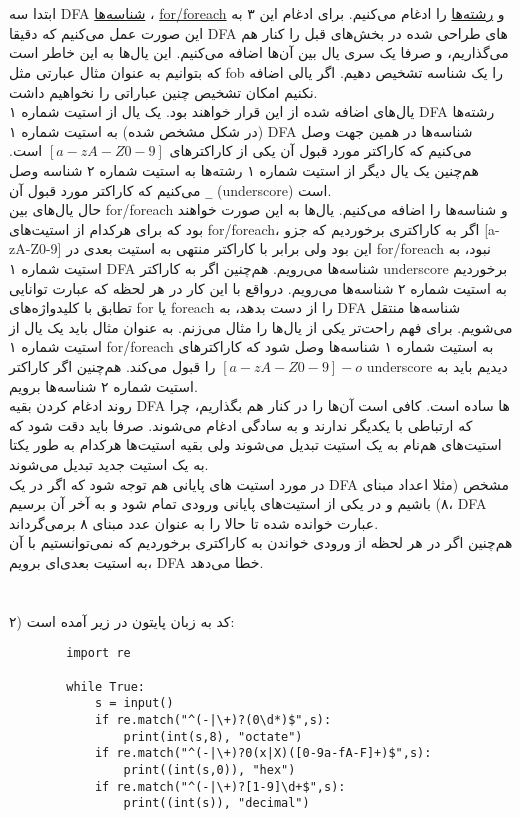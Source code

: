 \\\\
ابتدا سه DFA 
\underline{شناسه‌ها‌}
،
\underline{for/foreach}
و 
\underline{رشته‌ها}
 را ادغام می‌کنیم. برای ادغام این ۳ به این صورت عمل می‌کنیم که دقیقا DFA های طراحی شده در بخش‌های قبل را کنار هم می‌گذاریم، و صرفا یک سری یال بین آن‌ها اضافه می‌کنیم. این یال‌ها به این خاطر است که بتوانیم به عنوان مثال عبارتی مثل fob را یک شناسه تشخیص دهیم. اگر یالی اضافه نکنیم امکان تشخیص چنین عباراتی را نخواهیم داشت.
\\
یال‌های اضافه شده از این قرار خواهند بود. یک یال از استیت شماره ۱ DFA رشته‌ها (در شکل مشخص شده) به استیت شماره ۱ DFA شناسه‌ها در همین جهت وصل می‌کنیم که کاراکتر مورد قبول آن یکی از کاراکترهای $[a-zA-Z0-9]$ است. هم‌چنین یک یال دیگر از استیت شماره ۱ رشته‌ها به استیت شماره ۲ شناسه وصل می‌کنیم که کاراکتر مورد قبول آن 
\verb/_/
(underscore) است.
\\
 حال یال‌های بین for/foreach و شناسه‌ها را اضافه می‌کنیم. یال‌ها به این صورت خواهند بود که برای هرکدام از استیت‌های for/foreach، اگر به کاراکتری برخوردیم که جزو [a-zA-Z0-9] این بود ولی برابر با کاراکتر منتهی به استیت بعدی در for/foreach نبود، به استیت شماره ۱ DFA شناسه‌ها می‌رویم. هم‌چنین اگر به کاراکتر underscore برخوردیم به استیت شماره ۲ شناسه‌ها می‌رویم. درواقع با این کار در هر لحظه که عبارت توانایی تطابق با کلیدواژه‌های for یا foreach را از دست بدهد، به DFA شناسه‌ها منتقل می‌شویم. برای فهم راحت‌تر یکی از یال‌ها را مثال می‌زنم. به عنوان مثال باید یک یال از استیت شماره ۱ for/foreach به استیت شماره ۱ شناسه‌ها وصل شود که کاراکترهای
$[a-zA-Z0-9]-o$
 را قبول می‌کند. هم‌چنین اگر کاراکتر underscore دیدیم باید به استیت شماره ۲ شناسه‌ها برویم.
 \\
 روند ادغام کردن بقیه DFA ها ساده است. کافی است آن‌ها را در کنار هم بگذاریم، چرا که ارتباطی با یکدیگر ندارند و به سادگی ادغام می‌شوند. صرفا باید دقت شود که استیت‌های هم‌نام به یک استیت تبدیل می‌شوند ولی بقیه استیت‌ها هرکدام به طور یکتا به یک استیت جدید تبدیل می‌شوند.
 \\
 در مورد استیت های پایانی هم توجه شود که اگر در یک DFA مشخص (مثلا اعداد مبنای ۸) باشیم و در یکی از استیت‌های پایانی ورودی تمام شود و به آخر آن برسیم، DFA عبارت خوانده شده تا حالا را به عنوان عدد مبنای ۸ برمی‌گرداند.
 \\
 هم‌چنین اگر در هر لحظه از ورودی خواندن به کاراکتری برخوردیم که نمی‌توانستیم با آن به استیت بعدی‌ای برویم، DFA خطا می‌دهد.
\\\\\\
۲) کد به زبان پایتون در زیر آمده است:
\begin{latin}
	\begin{verbatim}
		import re  
		 
		while True:
		    s = input()
		    if re.match("^(-|\+)?(0\d*)$",s):
		        print(int(s,8), "octate")
		    if re.match("^(-|\+)?0(x|X)([0-9a-fA-F]+)$",s):
		        print((int(s,0)), "hex")
		    if re.match("^(-|\+)?[1-9]\d+$",s):
		        print((int(s)), "decimal")
	\end{verbatim}
\end{latin}